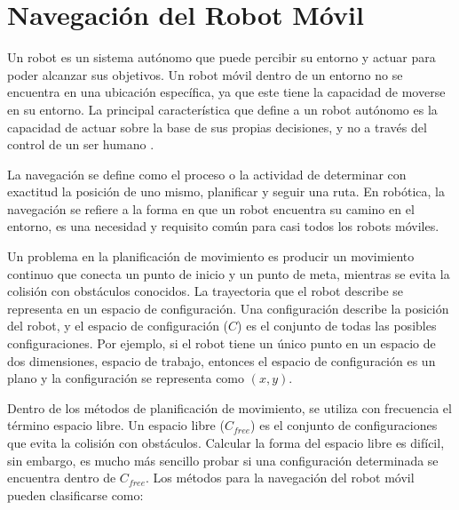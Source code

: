 \section{Navegaci\'on del Robot M\'ovil}

Un robot es un sistema aut\'onomo que puede percibir su entorno y actuar para poder
alcanzar sus objetivos. Un robot m\'ovil dentro de un entorno no se encuentra en una 
ubicaci\'on espec\'ifica, ya que este tiene la capacidad de moverse en su entorno. La 
principal caracter\'istica que define a un robot aut\'onomo es la capacidad de actuar 
sobre la base de sus propias decisiones, y no a trav\'es del control de un ser 
humano \cite{mataric2007robotics}.

La navegaci\'on se define como el proceso o la actividad de determinar con exactitud 
la posici\'on de uno mismo, planificar y seguir una ruta. En rob\'otica, la navegaci\'on 
se refiere a la forma en que un robot encuentra su camino en el entorno, es una necesidad 
y requisito com\'un para casi todos los robots m\'oviles. %

Un problema en la planificaci\'on de movimiento es producir un movimiento 
continuo que conecta un punto de inicio y un punto de meta, mientras se evita 
la colisi\'on con obst\'aculos conocidos. La trayectoria que el robot describe 
se representa en un espacio de configuraci\'on. Una configuraci\'on describe 
la posici\'on del robot, y el espacio de configuraci\'on ($C$) es el conjunto 
de todas las posibles configuraciones. Por ejemplo, si el robot tiene 
un \'unico punto en un espacio de dos dimensiones, espacio de trabajo, entonces 
el espacio de configuraci\'on es un plano y la configuraci\'on se representa 
como $(x,y)$.

Dentro de los m\'etodos de planificaci\'on de movimiento, se utiliza con frecuencia 
el t\'ermino espacio libre. Un espacio libre ($C_{free}$) es el conjunto de 
configuraciones que evita la colisi\'on con obst\'aculos. Calcular la forma 
del espacio libre es dif\'icil, sin embargo, es mucho m\'as sencillo probar si 
una configuraci\'on determinada se encuentra dentro de $C_{free}$. Los métodos
para la navegación del robot móvil pueden clasificarse como:


